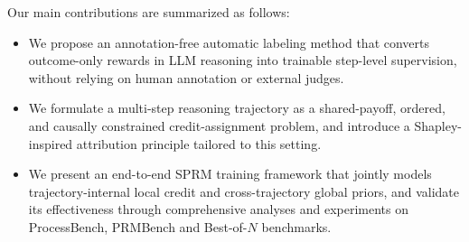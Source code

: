 Our main contributions are summarized as follows:

\begin{itemize}
    \item We propose an annotation-free automatic labeling method that
    converts outcome-only rewards in LLM reasoning into trainable step-level
    supervision, without relying on human annotation or external judges.
    \item We formulate a multi-step reasoning trajectory as a shared-payoff,
    ordered, and causally constrained credit-assignment problem, and
    introduce a Shapley-inspired attribution principle tailored to this
    setting.
    \item We present an end-to-end SPRM training framework that jointly
    models trajectory-internal local credit and cross-trajectory global
    priors, and validate its effectiveness through comprehensive analyses
    and experiments on ProcessBench, PRMBench and Best-of-\(N\)
    benchmarks.
\end{itemize}